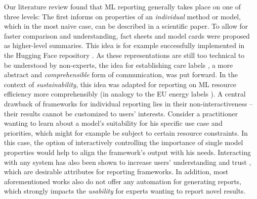 \documentclass[sn-mathphys,Numbered]{sn-jnl}%
\theoremstyle{thmstylethree}%
\begin{document}
Our literature review found that ML reporting generally takes place on one of three levels:
The first informs on properties of an \emph{individual} method or model, which in the most naive case, can be described in a scientific paper.
To allow for faster comparison and understanding, fact sheets \cite{arnold2019factsheets} and model cards \cite{Mitchell/etal/2019a} were proposed as higher-level summaries.
This idea is for example successfully implemented in the Hugging Face repository \cite{jain_hugging_2022}.
As these representations are still too technical to be understood by non-experts, the idea for establishing care labels \cite{yeswecare}, a more abstract and \emph{comprehensible} form of communication, was put forward.
In the context of \emph{sustainability}, this idea was adapted for reporting on ML resource efficiency more comprehensibly \cite{Assessing_Energy_Efficiency_of_ML} (in analogy to the EU energy labels \cite{eu-washingmachines}).
A central drawback of frameworks for individual reporting lies in their non-interactiveness -- their results cannot be customized to users' interests.
Consider a practitioner wanting to learn about a model's suitability for his specific use case and priorities, which might for example be subject to certain resource constraints.
In this case, the option of interactively controlling the importance of single model properties would help to align the framework's output with his needs.
Interacting with any system has also been shown to increase users' understanding and trust \cite{beckhsok}, which are desirable attributes for reporting frameworks.
In addition, most aforementioned works \cite{arnold2019factsheets,Mitchell/etal/2019a} also do not offer any automation for generating reports, which strongly impacts the \emph{usability} for experts wanting to report novel results.
\end{document}
